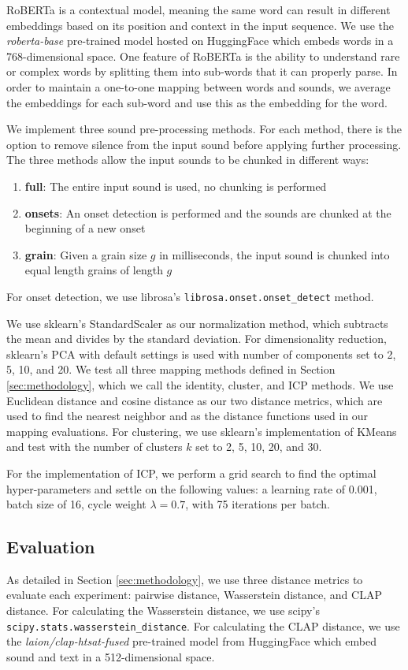 \documentclass[twoside,a4paper]{article}
\begin{document}
RoBERTa is a contextual model, meaning the same word can result in different embeddings based on its position and context in the input sequence. We use the \textit{roberta-base} pre-trained model hosted on HuggingFace which embeds words in a 768-dimensional space. One feature of RoBERTa is the ability to understand rare or complex words by splitting them into sub-words that it can properly parse. In order to maintain a one-to-one mapping between words and sounds, we average the embeddings for each sub-word and use this as the embedding for the word.

We implement three sound pre-processing methods. For each method, there is the option to remove silence from the input sound before applying further processing. The three methods allow the input sounds to be chunked in different ways:
\begin{enumerate}
    \item \textbf{full}: The entire input sound is used, no chunking is performed
    \item \textbf{onsets}: An onset detection is performed and the sounds are chunked at the beginning of a new onset
    \item \textbf{grain}: Given a grain size $g$ in milliseconds, the input sound is chunked into equal length grains of length $g$
\end{enumerate}
For onset detection, we use librosa's \texttt{librosa.onset.onset\_detect} method.

We use sklearn's StandardScaler as our normalization method, which subtracts the mean and divides by the standard deviation. For dimensionality reduction, sklearn's PCA with default settings is used with number of components set to 2, 5, 10, and 20. We test all three mapping methods defined in Section \ref{sec:methodology}, which we call the identity, cluster, and ICP methods. We use Euclidean distance and cosine distance as our two distance metrics, which are used to find the nearest neighbor and as the distance functions used in our mapping evaluations. For clustering, we use sklearn's implementation of KMeans and test with the number of clusters $k$ set to 2, 5, 10, 20, and 30.

For the implementation of ICP, we perform a grid search to find the optimal hyper-parameters and settle on the following values: a learning rate of 0.001, batch size of 16, cycle weight $\lambda = 0.7$, with 75 iterations per batch.

\subsection{Evaluation}\label{ssec:evaluation}
As detailed in Section \ref{sec:methodology}, we use three distance metrics to evaluate each experiment: pairwise distance, Wasserstein distance, and CLAP distance. For calculating the Wasserstein distance, we use scipy's \texttt{scipy.stats.wasserstein\_distance}. For calculating the CLAP distance, we use the \textit{laion/clap-htsat-fused} pre-trained model from HuggingFace which embed sound and text in a 512-dimensional space.
\end{document}
